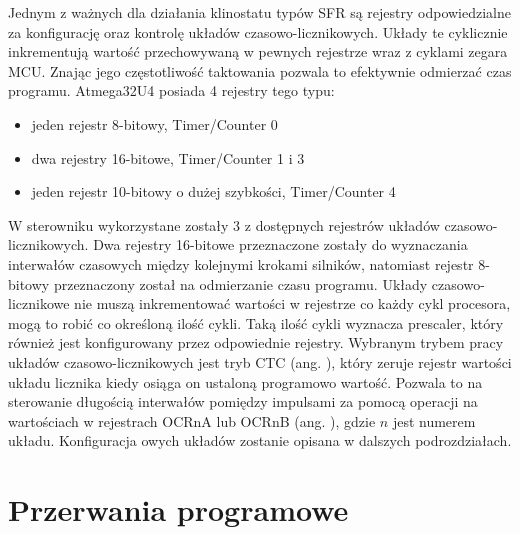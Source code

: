 Jednym z ważnych dla działania klinostatu typów SFR są rejestry odpowiedzialne za konfigurację oraz kontrolę układów czasowo-licznikowych. Układy te cyklicznie inkrementują wartość przechowywaną w pewnych rejestrze wraz z cyklami zegara MCU. Znając jego częstotliwość taktowania pozwala to efektywnie odmierzać czas programu. Atmega32U4 posiada 4 rejestry tego typu: 
\begin{itemize}
	\item jeden rejestr 8-bitowy, Timer/Counter 0
	\item dwa rejestry 16-bitowe, Timer/Counter 1 i 3
	\item jeden rejestr 10-bitowy o dużej szybkości, Timer/Counter 4
\end{itemize}

W sterowniku wykorzystane zostały 3 z dostępnych rejestrów układów czasowo-licznikowych. Dwa rejestry 16-bitowe przeznaczone zostały do wyznaczania interwałów czasowych między kolejnymi krokami silników, natomiast rejestr 8-bitowy przeznaczony został na odmierzanie czasu programu. Układy czasowo-licznikowe nie muszą inkrementować wartości w rejestrze co każdy cykl procesora, mogą to robić co określoną ilość cykli. Taką ilość cykli wyznacza prescaler, który również jest konfigurowany przez odpowiednie rejestry. Wybranym trybem pracy układów czasowo-licznikowych jest tryb CTC (ang. ), który zeruje rejestr wartości układu licznika kiedy osiąga on ustaloną programowo wartość. Pozwala to na sterowanie długością interwałów pomiędzy impulsami za pomocą operacji na wartościach w  rejestrach OCRnA lub OCRnB (ang. ), gdzie $n$ jest numerem układu. Konfiguracja owych układów zostanie opisana w dalszych podrozdziałach.

\section{Przerwania programowe}

